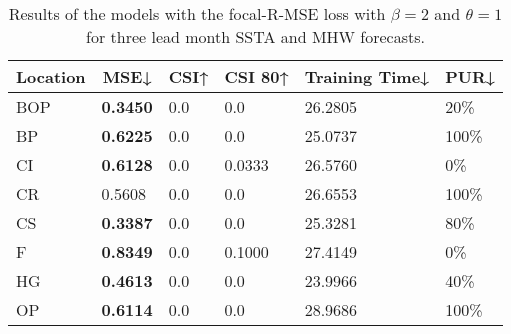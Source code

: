 \documentclass[11pt, a4paper]{article}
\begin{document}
\begin{table}[H]
\centering
\small
\caption{Results of the models with the focal-R-MSE loss with $\beta=2$ and $\theta=1$ for three lead month SSTA and MHW forecasts.}
\begin{tabular}{llllll}
\multicolumn{1}{c}{\textbf{Location}} & \multicolumn{1}{c}{\textbf{MSE↓}} & \multicolumn{1}{c}{\textbf{CSI↑}} & \multicolumn{1}{c}{\textbf{CSI 80↑}} & \multicolumn{1}{c}{\textbf{Training Time↓}} & \multicolumn{1}{c}{\textbf{PUR↓}} \\ \hline
BOP                         & \textbf{0.3450}                   & 0.0                               & 0.0                                  & 26.2805                                     & 20\%                              \\
BP                        & \textbf{0.6225}                   & 0.0                               & 0.0                                  & 25.0737                                     & 100\%                             \\
CI                        & \textbf{0.6128}                   & 0.0                               & 0.0333                               & 26.5760                                     & 0\%                               \\
CR                           & 0.5608                            & 0.0                               & 0.0                                  & 26.6553                                     & 100\%                             \\
CS                           & \textbf{0.3387}                   & 0.0                               & 0.0                                  & 25.3281                                     & 80\%                              \\
F                             & \textbf{0.8349}                   & 0.0                               & 0.1000                               & 27.4149                                     & 0\%                               \\
HG                          & \textbf{0.4613}                   & 0.0                               & 0.0                                  & 23.9966                                     & 40\%                              \\
OP                       & \textbf{0.6114}                   & 0.0                               & 0.0                                  & 28.9686                                     & 100\%                             \\

\end{tabular}
\end{table}
\end{document}
